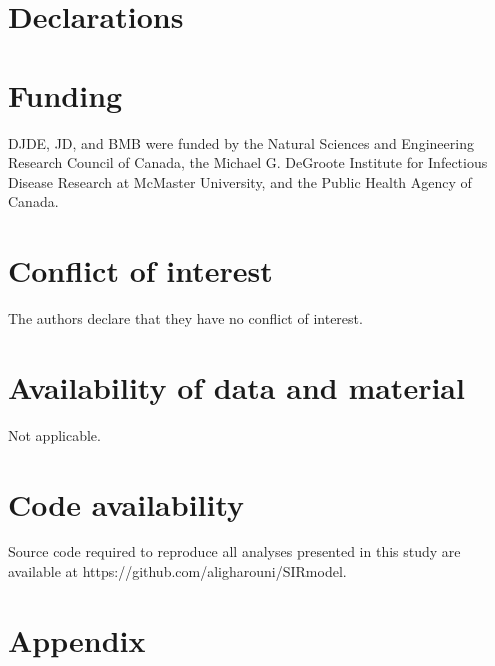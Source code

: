 \documentclass[smallextended]{svjour3}       %
\DeclareRobustCommand\_{\ifmmode\expandafter\subtxt\else\textunderscore\fi}
\begin{document}
%
\section*{Declarations}

\section*{Funding}

DJDE, JD, and BMB were funded by the Natural Sciences and Engineering
Research Council of Canada, the Michael G. DeGroote Institute for Infectious
Disease Research at McMaster University, and the Public Health Agency of
Canada.

\section*{Conflict of interest}

The authors declare that they have no conflict of interest.

\section*{Availability of data and material}

Not applicable.

\section*{Code availability} 

Source code required to reproduce all analyses presented in this study are available at https://github.com/aligharouni/SIRmodel.


\clearpage
\appendix
\section{Appendix}
\label{appe}

\end{document}
